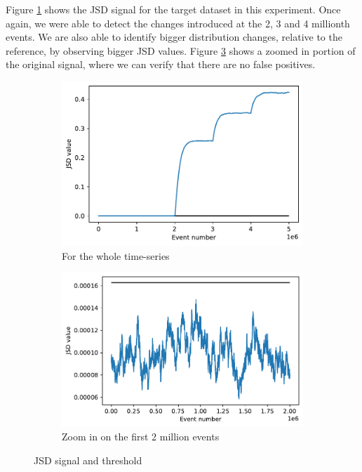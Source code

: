 Figure \ref{fig:JSD-signal-test03} shows the JSD signal for the target dataset in this experiment. Once again, we were able to detect the changes introduced at the 2, 3 and 4 millionth events. We are also able to identify bigger distribution changes, relative to the reference, by observing bigger JSD values. Figure \ref{fig:JSD-signal-zoom-test03} shows a zoomed in portion of the original signal, where we can verify that there are no false positives.
\begin{figure}[!htb]
\centering
\begin{subfigure}{.5\textwidth}
  \centering
  \includegraphics[width=1\linewidth]{figures/stream-analysis-viz-test03.pdf}
  \caption{For the whole time-series}
  \label{fig:JSD-signal-test03}
\end{subfigure}%
\begin{subfigure}{.5\textwidth}
  \centering
  \includegraphics[width=1\linewidth]{figures/stream-analysis-viz-zoom-test03.pdf}
  \caption{Zoom in on the first 2 million events}
  \label{fig:JSD-signal-zoom-test03}
\end{subfigure}
\caption{JSD signal and threshold}
\end{figure}

